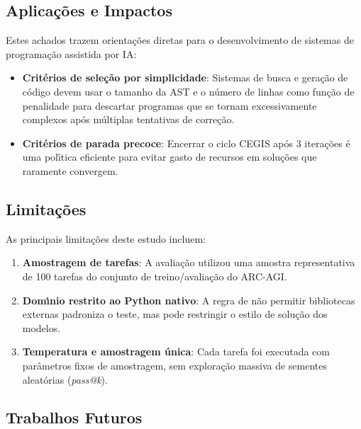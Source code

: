 \subsection{Aplica\c{c}\~{o}es e Impactos}

Estes achados trazem orienta\c{c}\~{o}es diretas para o desenvolvimento de sistemas de programa\c{c}\~{a}o assistida por IA:
\begin{itemize}
    \item \textbf{Crit\'{e}rios de sele\c{c}\~{a}o por simplicidade}: Sistemas de busca e gera\c{c}\~{a}o de c\'{o}digo devem usar o tamanho da AST e o n\'{u}mero de linhas como fun\c{c}\~{a}o de penalidade para descartar programas que se tornam excessivamente complexos ap\'{o}s m\'{u}ltiplas tentativas de corre\c{c}\~{a}o.
    \item \textbf{Crit\'{e}rios de parada precoce}: Encerrar o ciclo CEGIS ap\'{o}s 3 itera\c{c}\~{o}es \'{e} uma pol\'{\i}tica eficiente para evitar gasto de recursos em solu\c{c}\~{o}es que raramente convergem.
\end{itemize}

\subsection{Limita\c{c}\~{o}es}

As principais limita\c{c}\~{o}es deste estudo incluem:
\begin{enumerate}
    \item \textbf{Amostragem de tarefas}: A avalia\c{c}\~{a}o utilizou uma amostra representativa de 100 tarefas do conjunto de treino/avalia\c{c}\~{a}o do ARC-AGI.
    \item \textbf{Dom\'{\i}nio restrito ao Python nativo}: A regra de n\~{a}o permitir bibliotecas externas padroniza o teste, mas pode restringir o estilo de solu\c{c}\~{a}o dos modelos.
    \item \textbf{Temperatura e amostragem \'{u}nica}: Cada tarefa foi executada com par\^{a}metros fixos de amostragem, sem explora\c{c}\~{a}o massiva de sementes aleat\'{o}rias (\textit{pass@k}).
\end{enumerate}

\subsection{Trabalhos Futuros}

